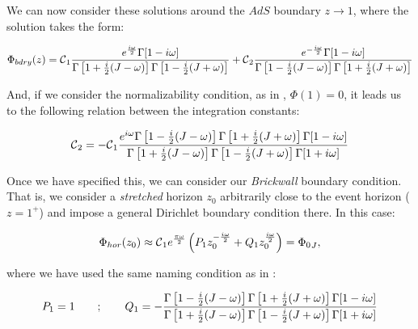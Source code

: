 \documentclass[11pt,a4paper]{article}
\begin{document}
We can now consider these solutions around the $AdS$ boundary $z\rightarrow 1$, where the solution takes the form:

\begin{equation}
    \Phi_{bdry}(z) = \mbox{${\cal C}$}_1\frac{e^{\frac{i\omega}{2}}\Gamma[1-i\omega]}{\Gamma\left[1+\frac{i}{2}(J-\omega)\right]\Gamma\left[1-\frac{i}{2}(J+\omega)\right]} + \mbox{${\cal C}$}_2\frac{e^{-\frac{i\omega}{2}}\Gamma[1-i\omega]}{\Gamma\left[1-\frac{i}{2}(J-\omega)\right]\Gamma\left[1+\frac{i}{2}(J+\omega)\right]}
\end{equation}

{\noindent And, if we consider the normalizability condition, as in \cite{Jeong_2025,Das_2023,das2023fuzzballsrandommatrices}, $\Phi(1)=0$, it leads us to the following relation between the integration constants:}

\begin{equation}
    \mbox{${\cal C}$}_2 = -\mbox{${\cal C}$}_1\frac{e^{i\omega}\Gamma\left[1-\frac{i}{2}(J-\omega)\right]\Gamma\left[1+\frac{i}{2}(J+\omega)\right]\Gamma[1-i\omega]}{\Gamma\left[1+\frac{i}{2}(J-\omega)\right]\Gamma\left[1-\frac{i}{2}(J+\omega)\right]\Gamma[1+i\omega]}
\end{equation}

Once we have specified this, we can consider our \textit{Brickwall} boundary condition. That is, we consider a \textit{stretched} horizon $z_0$ arbitrarily close to the event horizon ($z=1^+$) and impose a general Dirichlet boundary condition there. In this case:

\begin{equation}\LA{BOUNDARY_BTZ}
    \Phi_{hor}(z_0)\approx \calc_1 e^{\frac{\pi\w}{2}}\left(P_1 z_0^{-\frac{i\w}{2}}+Q_1 z_0^{\frac{i\w}{2}}\right) = {\Phi_0}_J,
\end{equation}

{\noindent where we have used the same naming condition as in \cite{Jeong_2025}:}

\begin{equation}
    P_1 = 1 ~~~~~~ ; ~~~~~~ Q_1 = - \frac{\Gamma\left[1-\frac{i}{2}(J-\omega)\right]\Gamma\left[1+\frac{i}{2}(J+\omega)\right]\Gamma[1-i\omega]}{\Gamma\left[1+\frac{i}{2}(J-\omega)\right]\Gamma\left[1-\frac{i}{2}(J+\omega)\right]\Gamma[1+i\omega]}
\end{equation}
\end{document}
